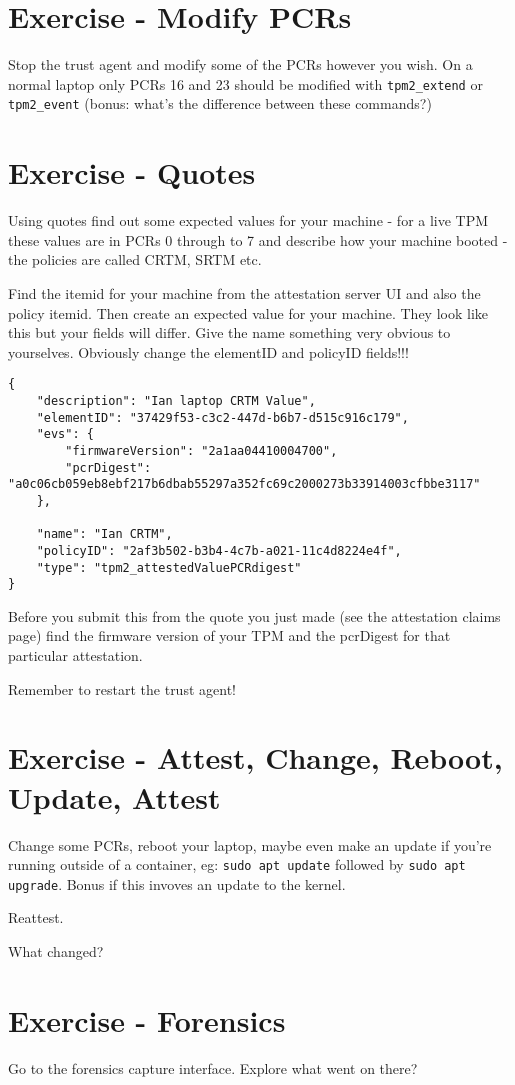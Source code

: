 \documentclass[10pt,a4paper]{article}
\begin{document}
\section{Exercise - Modify PCRs}
Stop the trust agent and modify some of the PCRs however you wish. On a normal laptop only PCRs 16 and 23 should be modified with \texttt{tpm2\_extend} or \texttt{tpm2\_event}  (bonus: what's the difference between these commands?)

\section{Exercise - Quotes}
Using quotes find out some expected values for your machine - for a live TPM these values are in PCRs 0 through to 7 and describe how your machine booted - the policies are called CRTM, SRTM etc. 

Find the itemid for your machine from the attestation server UI and also the policy itemid. Then create an expected value for your machine. They look like this but your fields will differ. Give the name something very obvious to yourselves. Obviously change the elementID and policyID fields!!!

\begin{verbatim}
{
    "description": "Ian laptop CRTM Value",
    "elementID": "37429f53-c3c2-447d-b6b7-d515c916c179",
    "evs": {
        "firmwareVersion": "2a1aa04410004700",
        "pcrDigest": "a0c06cb059eb8ebf217b6dbab55297a352fc69c2000273b33914003cfbbe3117"
    },

    "name": "Ian CRTM",
    "policyID": "2af3b502-b3b4-4c7b-a021-11c4d8224e4f",
    "type": "tpm2_attestedValuePCRdigest"
}
\end{verbatim}


Before you submit this from the quote you just made (see the attestation claims page) find the firmware version of your TPM and the pcrDigest for that particular attestation.

Remember to restart the trust agent!

\section{Exercise - Attest, Change, Reboot, Update, Attest}

Change some PCRs, reboot your laptop, maybe even make an update if you're running outside of a container, eg:  \texttt{sudo apt update} followed by \texttt{sudo apt upgrade}.  Bonus if this invoves an update to the kernel.

Reattest.

What changed?

\section{Exercise - Forensics}
Go to the forensics capture interface. Explore what went on there?
\end{document}
